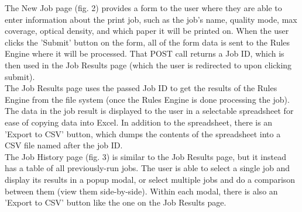 \documentclass[onecolumn, draftclsnofoot,10pt, compsoc]{IEEEtran}
\begin{document}
\noindent The New Job page (fig. 2) provides a form to the user where they are able to enter information about the print job, such as the job's name, quality mode, max coverage, optical density, and which paper it will be printed on. When the user clicks the 'Submit' button on the form, all of the form data is sent to the Rules Engine where it will be processed. That POST call returns a Job ID, which is then used in the Job Results page (which the user is redirected to upon clicking submit).\\[10pt]
The Job Results page uses the passed Job ID to get the results of the Rules Engine from the file system (once the Rules Engine is done processing the job). The data in the job result is displayed to the user in a selectable spreadsheet for ease of copying data into Excel. In addition to the spreadsheet, there is an 'Export to CSV' button, which dumps the contents of the spreadsheet into a CSV file named after the job ID.\\[10pt]
The Job History page (fig. 3) is similar to the Job Results page, but it instead has a table of all previously-run jobs. The user is able to select a single job and display its results in a popup modal, or select multiple jobs and do a comparison between them (view them side-by-side). Within each modal, there is also an 'Export to CSV' button like the one on the Job Results page.
\end{document}
